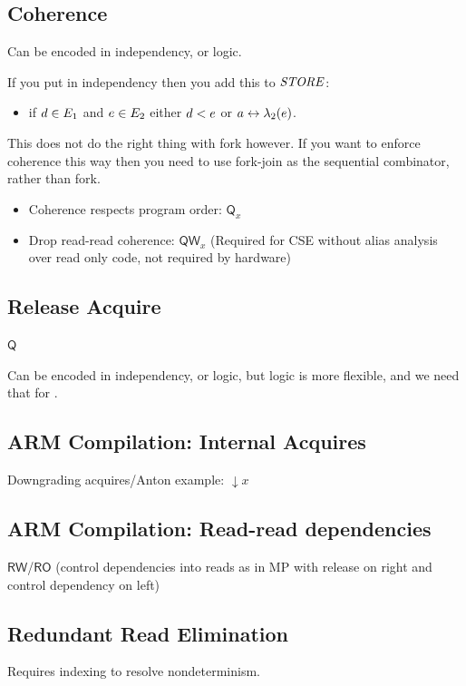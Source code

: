 \subsection{Coherence}
Can be encoded in independency, or logic.

If you put in independency then you add this to $\sSTORE{}{}$:
\begin{itemize}
\item if $\bEv\in\aEvs_1$ and $\aEv\in\aEvs_2$ either $\bEv<\SB0\aEv$ or $a\reorder\labeling_2(\aEv)$.
\end{itemize}
This does not do the right thing with fork however.  If you want to enforce
coherence this way then you need to use fork-join as the sequential
combinator, rather than fork.

\begin{itemize}
\item Coherence respects program order: $\mathsf{Q}_{x}$
\item Drop read-read coherence: $\mathsf{QW}_{x}$ (Required for CSE without
  alias analysis over read only code, not required by hardware)
\end{itemize}

\subsection{Release Acquire}
$\mathsf{Q}$

Can be encoded in independency, or logic, but logic is more flexible, and we
need that for \armeight.

\subsection{ARM Compilation: Internal Acquires}
Downgrading acquires/Anton example: ${\downarrow} x$

\subsection{ARM Compilation: Read-read dependencies}
$\mathsf{RW}$/$\mathsf{RO}$ (control dependencies into reads as in MP with
release on right and control dependency on left)

\subsection{Redundant Read Elimination}

Requires indexing to resolve nondeterminism.

